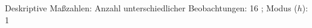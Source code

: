 				\label{tableValues:adem03b_g2}
				\vspace*{-\baselineskip}
                    \begin{noten}
                	    \note{} Deskriptive Maßzahlen:
                	    Anzahl unterschiedlicher Beobachtungen: 16%
                	    ; 
                	      Modus ($h$): 1
                     \end{noten}


